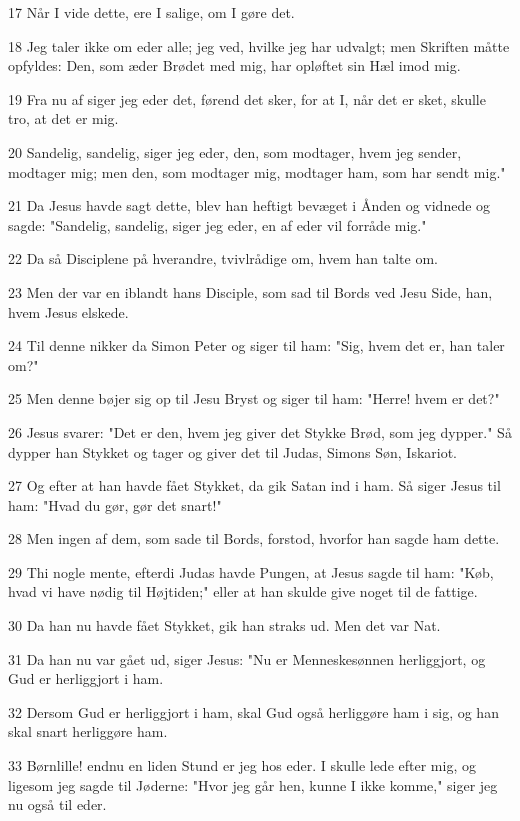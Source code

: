 \par 17 Når I vide dette, ere I salige, om I gøre det.
\par 18 Jeg taler ikke om eder alle; jeg ved, hvilke jeg har udvalgt; men Skriften måtte opfyldes: Den, som æder Brødet med mig, har opløftet sin Hæl imod mig.
\par 19 Fra nu af siger jeg eder det, førend det sker, for at I, når det er sket, skulle tro, at det er mig.
\par 20 Sandelig, sandelig, siger jeg eder, den, som modtager, hvem jeg sender, modtager mig; men den, som modtager mig, modtager ham, som har sendt mig."
\par 21 Da Jesus havde sagt dette, blev han heftigt bevæget i Ånden og vidnede og sagde: "Sandelig, sandelig, siger jeg eder, en af eder vil forråde mig."
\par 22 Da så Disciplene på hverandre, tvivlrådige om, hvem han talte om.
\par 23 Men der var en iblandt hans Disciple, som sad til Bords ved Jesu Side, han, hvem Jesus elskede.
\par 24 Til denne nikker da Simon Peter og siger til ham: "Sig, hvem det er, han taler om?"
\par 25 Men denne bøjer sig op til Jesu Bryst og siger til ham: "Herre! hvem er det?"
\par 26 Jesus svarer: "Det er den, hvem jeg giver det Stykke Brød, som jeg dypper." Så dypper han Stykket og tager og giver det til Judas, Simons Søn, Iskariot.
\par 27 Og efter at han havde fået Stykket, da gik Satan ind i ham. Så siger Jesus til ham: "Hvad du gør, gør det snart!"
\par 28 Men ingen af dem, som sade til Bords, forstod, hvorfor han sagde ham dette.
\par 29 Thi nogle mente, efterdi Judas havde Pungen, at Jesus sagde til ham: "Køb, hvad vi have nødig til Højtiden;" eller at han skulde give noget til de fattige.
\par 30 Da han nu havde fået Stykket, gik han straks ud. Men det var Nat.
\par 31 Da han nu var gået ud, siger Jesus: "Nu er Menneskesønnen herliggjort, og Gud er herliggjort i ham.
\par 32 Dersom Gud er herliggjort i ham, skal Gud også herliggøre ham i sig, og han skal snart herliggøre ham.
\par 33 Børnlille! endnu en liden Stund er jeg hos eder. I skulle lede efter mig, og ligesom jeg sagde til Jøderne: "Hvor jeg går hen, kunne I ikke komme," siger jeg nu også til eder.
